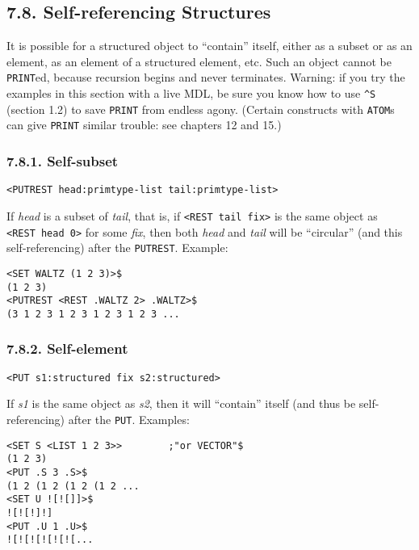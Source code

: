 \documentclass[a4paper,]{article}
\begin{document}
\subsection{7.8. Self-referencing Structures}\label{self-referencing-structures}

It is possible for a structured object to ``contain'' itself, either as a subset or as an element, as an element of a
structured element, etc. Such an object cannot be \texttt{PRINT}ed, because recursion begins and never terminates. Warning:
if you try the examples in this section with a live MDL, be sure you know how to use \texttt{\^{}S} (section 1.2) to save
\texttt{PRINT} from endless agony. (Certain constructs with \texttt{ATOM}s can give \texttt{PRINT} similar trouble: see
chapters 12 and 15.)

\subsubsection{7.8.1. Self-subset}\label{self-subset}

\begin{verbatim}
<PUTREST head:primtype-list tail:primtype-list>
\end{verbatim}

 If \emph{head} is a subset of \emph{tail}, that is, if
\texttt{\textless{}REST\ tail\ fix\textgreater{}} is the same object as \texttt{\textless{}REST\ head\ 0\textgreater{}} for
some \emph{fix}, then both \emph{head} and \emph{tail} will be ``circular'' (and this self-referencing) after the
\texttt{PUTREST}. Example:

\begin{verbatim}
<SET WALTZ (1 2 3)>$
(1 2 3)
<PUTREST <REST .WALTZ 2> .WALTZ>$
(3 1 2 3 1 2 3 1 2 3 1 2 3 ...
\end{verbatim}

\subsubsection{7.8.2. Self-element}\label{self-element}

\begin{verbatim}
<PUT s1:structured fix s2:structured>
\end{verbatim}

If \emph{s1} is the same object as \emph{s2}, then it will ``contain'' itself (and thus be self-referencing) after the
\texttt{PUT}. Examples:

\begin{verbatim}
<SET S <LIST 1 2 3>>        ;"or VECTOR"$
(1 2 3)
<PUT .S 3 .S>$
(1 2 (1 2 (1 2 (1 2 ...
<SET U ![![]]>$
![![!]!]
<PUT .U 1 .U>$
![![![![![![...
\end{verbatim}
\end{document}
